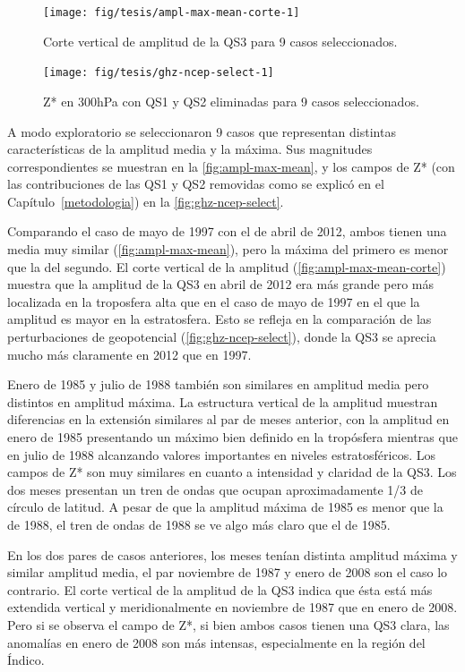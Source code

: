 \documentclass[spanish,a4paper,12pt,oneside]{book}
\begin{document}
\begin{figure}
\texttt{[image: fig/tesis/ampl-max-mean-corte-1]} \caption{Corte vertical de amplitud de la QS3 para 9 casos seleccionados.}\label{fig:ampl-max-mean-corte}
\end{figure}

\begin{figure}
\texttt{[image: fig/tesis/ghz-ncep-select-1]} \caption{Z* en 300hPa con QS1 y QS2 eliminadas para 9 casos seleccionados.}\label{fig:ghz-ncep-select}
\end{figure}

A modo exploratorio se seleccionaron 9 casos que representan distintas
características de la amplitud media y la máxima. Sus magnitudes
correspondientes se muestran en la \autoref{fig:ampl-max-mean}, y los
campos de Z* (con las contribuciones de las QS1 y QS2 removidas como se
explicó en el Capítulo~\ref{metodologia}) en la
\autoref{fig:ghz-ncep-select}.

Comparando el caso de mayo de 1997 con el de abril de 2012, ambos tienen
una media muy similar (\autoref{fig:ampl-max-mean}), pero la máxima del
primero es menor que la del segundo. El corte vertical de la amplitud
(\autoref{fig:ampl-max-mean-corte}) muestra que la amplitud de la QS3 en
abril de 2012 era más grande pero más localizada en la troposfera alta
que en el caso de mayo de 1997 en el que la amplitud es mayor en la
estratosfera. Esto se refleja en la comparación de las perturbaciones de
geopotencial (\autoref{fig:ghz-ncep-select}), donde la QS3 se aprecia
mucho más claramente en 2012 que en 1997.

Enero de 1985 y julio de 1988 también son similares en amplitud media
pero distintos en amplitud máxima. La estructura vertical de la amplitud
muestran diferencias en la extensión similares al par de meses anterior,
con la amplitud en enero de 1985 presentando un máximo bien definido en
la tropósfera mientras que en julio de 1988 alcanzando valores
importantes en niveles estratosféricos. Los campos de Z* son muy
similares en cuanto a intensidad y claridad de la QS3. Los dos meses
presentan un tren de ondas que ocupan aproximadamente 1/3 de círculo de
latitud. A pesar de que la amplitud máxima de 1985 es menor que la de
1988, el tren de ondas de 1988 se ve algo más claro que el de 1985.

En los dos pares de casos anteriores, los meses tenían distinta amplitud
máxima y similar amplitud media, el par noviembre de 1987 y enero de
2008 son el caso lo contrario. El corte vertical de la amplitud de la
QS3 indica que ésta está más extendida vertical y meridionalmente en
noviembre de 1987 que en enero de 2008. Pero si se observa el campo de
Z*, si bien ambos casos tienen una QS3 clara, las anomalías en enero de
2008 son más intensas, especialmente en la región del Índico.
\end{document}
